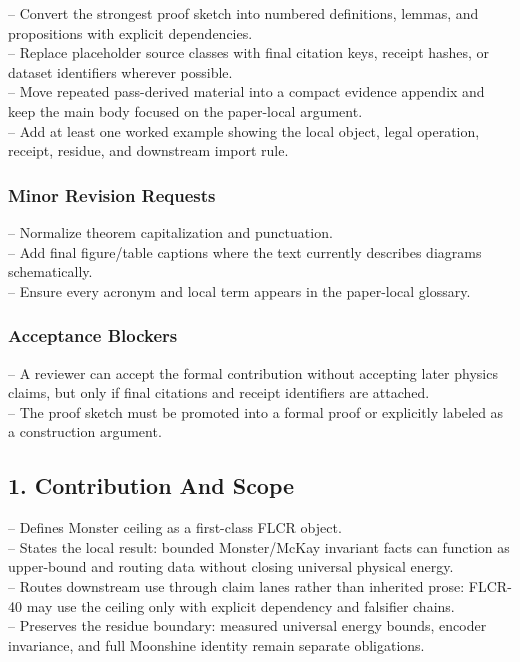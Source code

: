 \documentclass[11pt]{article}
\begin{document}
\noindent{}-- Convert the strongest proof sketch into numbered definitions, lemmas, and propositions with explicit dependencies.\\
\noindent{}-- Replace placeholder source classes with final citation keys, receipt hashes, or dataset identifiers wherever possible.\\
\noindent{}-- Move repeated pass-derived material into a compact evidence appendix and keep the main body focused on the paper-local argument.\\
\noindent{}-- Add at least one worked example showing the local object, legal operation, receipt, residue, and downstream import rule.\\

\subsubsection*{Minor Revision Requests}

\noindent{}-- Normalize theorem capitalization and punctuation.\\
\noindent{}-- Add final figure/table captions where the text currently describes diagrams schematically.\\
\noindent{}-- Ensure every acronym and local term appears in the paper-local glossary.\\

\subsubsection*{Acceptance Blockers}

\noindent{}-- A reviewer can accept the formal contribution without accepting later physics claims, but only if final citations and receipt identifiers are attached.\\
\noindent{}-- The proof sketch must be promoted into a formal proof or explicitly labeled as a construction argument.\\


\subsection*{1. Contribution And Scope}

\noindent{}-- Defines Monster ceiling as a first-class FLCR object.\\
\noindent{}-- States the local result: bounded Monster/McKay invariant facts can function as upper-bound and routing data without closing universal physical energy.\\
\noindent{}-- Routes downstream use through claim lanes rather than inherited prose: FLCR-40 may use the ceiling only with explicit dependency and falsifier chains.\\
\noindent{}-- Preserves the residue boundary: measured universal energy bounds, encoder invariance, and full Moonshine identity remain separate obligations.\\
\end{document}

